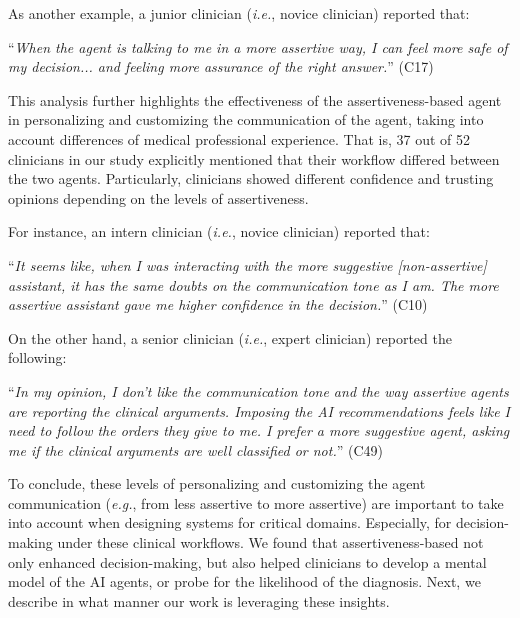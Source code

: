 
\noindent
As another example, a junior clinician ({\it i.e.}, novice clinician) reported that:

\vspace{2.5mm}

\noindent
``{\it When the agent is talking to me in a more assertive way, I can feel more safe of my decision... and feeling more assurance of the right answer.}'' (C17)

\vspace{2.5mm}

This analysis further highlights the effectiveness of the assertiveness-based agent in personalizing and customizing the communication of the agent, taking into account differences of medical professional experience.
That is, 37 out of 52 clinicians in our study explicitly mentioned that their workflow differed between the two agents.
Particularly, clinicians showed different confidence and trusting opinions depending on the levels of assertiveness.

\vspace{2.5mm}

\noindent
For instance, an intern clinician ({\it i.e.}, novice clinician) reported that:

\vspace{2.5mm}

\noindent
``{\it It seems like, when I was interacting with the more suggestive [non-assertive] assistant, it has the same doubts on the communication tone as I am. The more assertive assistant gave me higher confidence in the decision.}'' (C10)

\vspace{2.5mm}

\noindent
On the other hand, a senior clinician ({\it i.e.}, expert clinician) reported the following:

\vspace{2.5mm}

\noindent
``{\it In my opinion, I don't like the communication tone and the way assertive agents are reporting the clinical arguments. Imposing the AI recommendations feels like I need to follow the orders they give to me. I prefer a more suggestive agent, asking me if the clinical arguments are well classified or not.}'' (C49)

\vspace{2.5mm}

To conclude, these levels of personalizing and customizing the agent communication ({\it e.g.}, from less assertive to more assertive) are important to take into account when designing systems for critical domains.
Especially, for decision-making under these clinical workflows.
We found that assertiveness-based not only enhanced decision-making, but also helped clinicians to develop a mental model of the AI agents, or probe for the likelihood of the diagnosis.
Next, we describe in what manner our work is leveraging these insights.

